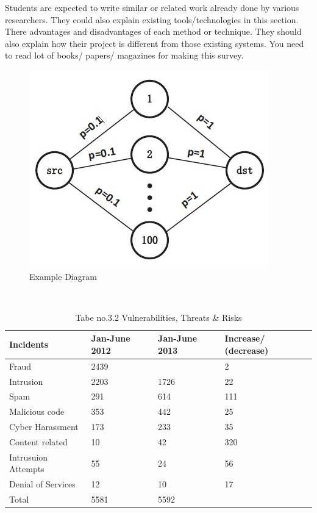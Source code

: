 \documentclass[11pt,a4paper]{article}
\begin{document}
Students are expected to write similar or related work already done by various researchers. They could also explain existing tools/technologies in this section. There advantages and disadvantages of each method or technique. They should also explain how their project is different from those existing systems. You need to read lot of books/ papers/ magazines for making this survey.

\begin{figure}[h]
\centering
 \includegraphics[]{1}
\caption{Example Diagram}
\end{figure}
\newpage
\begin{center}
\begin{table}
\caption{Tabe no.3.2 Vulnerabilities, Threats & Risks }\\

\begin{tabular}{|p{8cm}|l|l|l|}
\hline 
\centering\textbf{Incidents} & \textbf{Jan-June 2012} & \centering \textbf{Jan-June 2013 } & \textbf{ Increase/ (decrease)}  \\ 
\hline 
Fraud & 2439 & \centering{2490} & 2   \\
\hline 
Intrusion & 2203 & 1726 & 22  \\
\hline
Spam & 291 & 614 & 111  \\
\hline
Malicious code & 353 & 442 & 25   \\
\hline
Cyber Harassment & 173 & 233 & 35  \\
\hline
Content related & 10 & 42 & 320    \\
\hline
Intrusuion Attempts & 55 & 24 & 56  \\
\hline
Denial of Services & 12 & 10 & 17  \\
\hline
Total & 5581 & 5592 &     \\
\hline
\end{tabular} 
\end{table}
\end{center}
\end{document}
